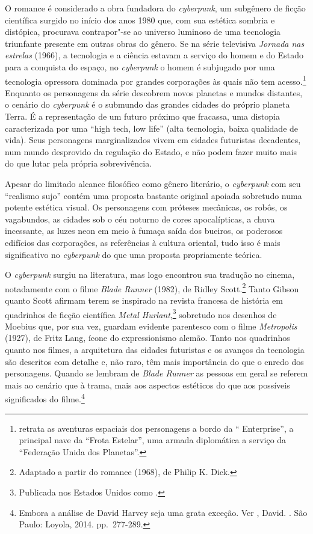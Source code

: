 O romance é considerado a obra fundadora do \emph{cyberpunk}, um
subgênero de ficção científica surgido no início dos anos 1980 que, com
sua estética sombria e distópica, procurava contrapor"-se ao universo
luminoso de uma tecnologia triunfante presente em outras obras do
gênero. Se na série televisiva \emph{Jornada nas estrelas} (1966), a
tecnologia e a ciência estavam a serviço do homem e do Estado para a
conquista do espaço, no \emph{cyberpunk} o homem é subjugado por uma
tecnologia opressora dominada por grandes corporações às quais não tem
acesso.\footnote{{} retrata as aventuras
  espaciais dos personagens a bordo da `` Enterprise'', a principal
  nave da ``Frota Estelar'', uma armada diplomática a serviço da
  ``Federação Unida dos Planetas''.} Enquanto os personagens da série
descobrem novos planetas e mundos distantes, o cenário do
\emph{cyberpunk} é o submundo das grandes cidades do próprio planeta
Terra. É a representação de um futuro próximo que fracassa, uma distopia
caracterizada por uma ``high tech, low life'' (alta tecnologia, baixa
qualidade de vida). Seus personagens marginalizados vivem em cidades
futuristas decadentes, num mundo desprovido da regulação do Estado, e
não podem fazer muito mais do que lutar pela própria sobrevivência.

Apesar do limitado alcance filosófico como gênero literário, o
\emph{cyberpunk} com seu ``realismo sujo'' contém uma proposta bastante
original apoiada sobretudo numa potente estética visual. Os personagens
com próteses mecânicas, os robôs, os vagabundos, as cidades sob o céu
noturno de cores apocalípticas, a chuva incessante, as luzes neon em
meio à fumaça saída dos bueiros, os poderosos edifícios das corporações,
as referências à cultura oriental, tudo isso é mais significativo no
\emph{cyberpunk} do que uma proposta propriamente teórica.

O \emph{cyberpunk} surgiu na literatura, mas logo encontrou sua tradução
no cinema, notadamente com o filme \emph{Blade Runner} (1982), de Ridley
Scott.\footnote{Adaptado a partir do romance {} (1968), de Philip K. Dick.} Tanto Gibson quanto
Scott afirmam terem se inspirado na revista francesa de história em
quadrinhos de ficção científica \emph{Metal Hurlant},\footnote{Publicada nos Estados Unidos como
  {.}} sobretudo nos
desenhos de Moebius que, por sua vez, guardam evidente parentesco com
o filme \emph{Metropolis} (1927), de Fritz Lang, ícone do expressionismo
alemão. Tanto nos quadrinhos quanto nos filmes, a arquitetura das
cidades futuristas e os avanços da tecnologia são descritos com detalhe
e, não raro, têm mais importância do que o enredo dos personagens.
Quando se lembram de \emph{Blade Runner} as pessoas em geral se referem
mais ao cenário que à trama, mais aos aspectos estéticos do que aos
possíveis significados do filme.\footnote{Embora a análise de David
  Harvey seja uma grata exceção. Ver , David. {}. São Paulo: Loyola,
  2014. pp.~277-289.}

